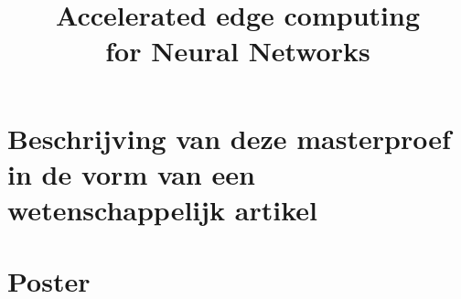 \documentclass[11pt,a4paper,twoside,openright]{report}
\title{Accelerated edge computing\\ for Neural Networks}
\begin{document}

\preface
\lstlistoflistings











\appendix


\chapter{Beschrijving van deze masterproef in de vorm van een wetenschappelijk artikel}
%

\chapter{Poster}



\end{document}
